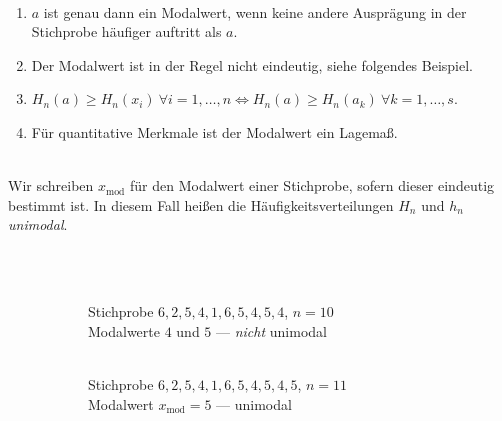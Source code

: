 \begin{bem}    \\
\begin{enumerate}[label=(\alph*)]
    \item $a$ ist genau dann ein Modalwert, wenn keine andere Ausprägung in der Stichprobe häufiger auftritt als $a$.
    \item Der Modalwert ist in der Regel nicht eindeutig, siehe folgendes Beispiel.
    \item $H_n(a)\geq H_n(x_i)\ \forall i=1,\dots,n \iff H_n(a)\geq H_n(a_k)\ \forall k=1,\dots,s$.
    \item Für quantitative \gls{Merkmal}e ist der Modalwert ein \gls{Lagemaß}.
\end{enumerate}
\end{bem}

\begin{defi}[Unimodal]  \\
    Wir schreiben $x_{\mathrm{mod}}$ für den Modalwert einer Stichprobe, sofern dieser eindeutig bestimmt ist.
    In diesem Fall heißen die Häufigkeitsverteilungen $H_n$ und $h_n$ \emph{unimodal}.
\end{defi}

\begin{bsp}[Würfeln]   \\
    \begin{figure}[H]
        \begin{subfigure}[t]{0.48\textwidth}
            \centering
            \\
            \footnotesize Stichprobe $6,2,5,4,1,6,5,4,5,4$, $n=10$\\
            Modalwerte $4$ und $5$ --- \emph{nicht} unimodal
        \end{subfigure}
        \hfill
        \begin{subfigure}[t]{0.48\textwidth}
            \centering
            \\
            \footnotesize Stichprobe $6,2,5,4,1,6,5,4,5,4,5$, $n=11$\\
            Modalwert $x_{\mathrm{mod}}=5$ --- unimodal
        \end{subfigure}\label{fig:figure7}
    \end{figure}
\end{bsp}

